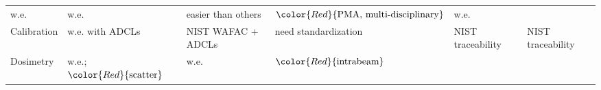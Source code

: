 \documentclass[]{book}
\theoremstyle{definition}
\theoremstyle{definition}
\theoremstyle{definition}
\theoremstyle{remark}
\begin{document}
\begin{longtable}[]{@{}llllll@{}}
\begin{minipage}[t]{0.11\columnwidth}
w.e.\strut
\end{minipage} & \begin{minipage}[t]{0.12\columnwidth}\raggedright\strut
w.e.\strut
\end{minipage} & \begin{minipage}[t]{0.15\columnwidth}\raggedright\strut
easier than others\strut
\end{minipage} & \begin{minipage}[t]{0.16\columnwidth}\raggedright\strut
\(\color{Red}{\text{PMA, multi-disciplinary}}\)\strut
\end{minipage} & \begin{minipage}[t]{0.15\columnwidth}\raggedright\strut
w.e.\strut
\end{minipage}\tabularnewline
\begin{minipage}[t]{0.14\columnwidth}\raggedright\strut
Calibration\strut
\end{minipage} & \begin{minipage}[t]{0.11\columnwidth}\raggedright\strut
w.e. with ADCLs\strut
\end{minipage} & \begin{minipage}[t]{0.12\columnwidth}\raggedright\strut
NIST WAFAC + ADCLs\strut
\end{minipage} & \begin{minipage}[t]{0.15\columnwidth}\raggedright\strut
need standardization\strut
\end{minipage} & \begin{minipage}[t]{0.16\columnwidth}\raggedright\strut
NIST traceability\strut
\end{minipage} & \begin{minipage}[t]{0.15\columnwidth}\raggedright\strut
NIST traceability\strut
\end{minipage}\tabularnewline
\begin{minipage}[t]{0.14\columnwidth}\raggedright\strut
Dosimetry\strut
\end{minipage} & \begin{minipage}[t]{0.11\columnwidth}\raggedright\strut
w.e.; \(\color{Red}{\text{scatter}}\)\strut
\end{minipage} & \begin{minipage}[t]{0.12\columnwidth}\raggedright\strut
w.e.\strut
\end{minipage} & \begin{minipage}[t]{0.15\columnwidth}\raggedright\strut
\(\color{Red}{\text{intrabeam}}\)\strut
\end{minipage} & \begin{minipage}[t]{0.16\columnwidth}\raggedright\strut

\end{minipage}
\end{longtable}
\end{document}
